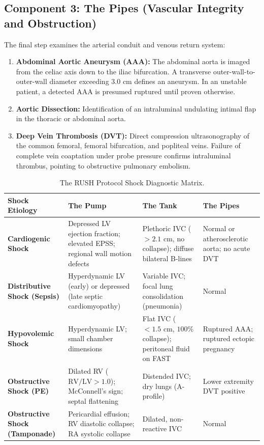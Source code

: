 \documentclass[11pt,a4paper]{article}
\begin{document}
\subsection{Component 3: The Pipes (Vascular Integrity and Obstruction)}
The final step examines the arterial conduit and venous return system:
\begin{enumerate}[leftmargin=2em]
    \item \textbf{Abdominal Aortic Aneurysm (AAA):} The abdominal aorta is imaged from the celiac axis down to the iliac bifurcation. A transverse outer-wall-to-outer-wall diameter exceeding $3.0\text{ cm}$ defines an aneurysm. In an unstable patient, a detected AAA is presumed ruptured until proven otherwise.
    \item \textbf{Aortic Dissection:} Identification of an intraluminal undulating intimal flap in the thoracic or abdominal aorta.
    \item \textbf{Deep Vein Thrombosis (DVT):} Direct compression ultrasonography of the common femoral, femoral bifurcation, and popliteal veins. Failure of complete vein coaptation under probe pressure confirms intraluminal thrombus, pointing to obstructive pulmonary embolism.
\end{enumerate}

\begin{table}[htbp]
\centering
\small
\setlength{\tabcolsep}{3.5pt}
\caption{The RUSH Protocol Shock Diagnostic Matrix.}
\label{tab:rush_matrix}
\begin{tabular}{p{2.6cm} p{3.8cm} p{4.5cm} p{3.8cm}}
\toprule
\textbf{Shock Etiology} & \textbf{The Pump} & \textbf{The Tank} & \textbf{The Pipes} \\
\midrule
\textbf{Cardiogenic Shock} & Depressed LV ejection fraction; elevated EPSS; regional wall motion defects & Plethoric IVC ($> 2.1\text{ cm}$, no collapse); diffuse bilateral B-lines & Normal or atherosclerotic aorta; no acute DVT \\
\addlinespace
\textbf{Distributive Shock (Sepsis)} & Hyperdynamic LV (early) or depressed (late septic cardiomyopathy) & Variable IVC; focal lung consolidation (pneumonia) & Normal \\
\addlinespace
\textbf{Hypovolemic Shock} & Hyperdynamic LV; small chamber dimensions & Flat IVC ($< 1.5\text{ cm}$, $100\%$ collapse); peritoneal fluid on FAST & Ruptured AAA; ruptured ectopic pregnancy \\
\addlinespace
\textbf{Obstructive Shock (PE)} & Dilated RV ($\text{RV}/\text{LV} > 1.0$); McConnell's sign; septal flattening & Distended IVC; dry lungs (A-profile) & Lower extremity DVT positive \\
\addlinespace
\textbf{Obstructive Shock (Tamponade)} & Pericardial effusion; RV diastolic collapse; RA systolic collapse & Dilated, non-reactive IVC & Normal \\
\bottomrule
\end{tabular}
\end{table}
\end{document}
